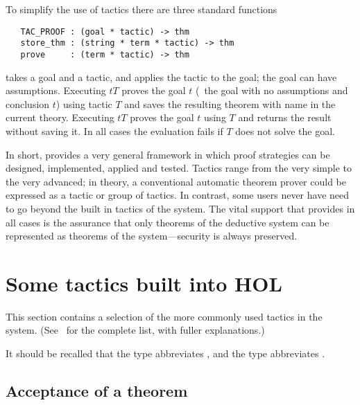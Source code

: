 To simplify the use of tactics there are three standard functions

\begin{holboxed}\begin{verbatim}
   TAC_PROOF : (goal * tactic) -> thm
   store_thm : (string * term * tactic) -> thm
   prove     : (term * tactic) -> thm
\end{verbatim}\end{holboxed}

\noindent {} takes a goal and a tactic, and applies the
tactic to the goal; the goal can have assumptions.  Executing
$t$\ml{,}$T$\ml{)} proves the goal
\ml{([],}$t$\ml{)} (\ie\ the goal with no assumptions and conclusion
$t$) using tactic $T$ and saves the resulting theorem with name
 in the current theory.  Executing
$t$\ml{,}$T$\ml{)} proves the goal \ml{([],}$t$\ml{)} using
$T$ and returns the result without saving it. In all cases the
evaluation fails if $T$ does not solve the goal.

In short, \HOL{} provides a very general framework in which proof
strategies can be designed, implemented, applied and tested.  Tactics
range from the very simple to the very advanced; in theory, a
conventional automatic theorem prover could be expressed as a tactic or group
of tactics.  In contrast, some users never have need to go beyond the
built in tactics of the system.  The vital support that \HOL{} provides
in all cases is the assurance that only theorems of the deductive system
can be represented as theorems of the \HOL{} system---security is
always preserved.

\section{Some tactics built into HOL}

This section contains a selection of the more commonly
used tactics in the \HOL{} system. (See \REFERENCE\
for the complete list, with fuller explanations.)

It should be recalled that the \ML{} type  abbreviates
\ml{thm->tactic}, and the type \ml{conv} abbreviates \ml{term->thm}.

\subsection{Acceptance of a theorem}


